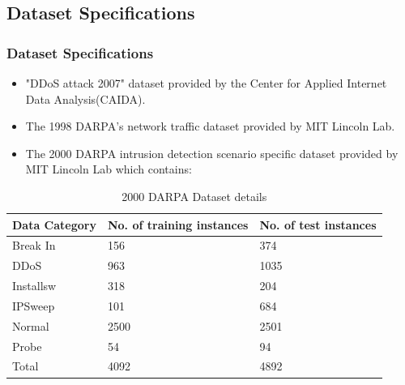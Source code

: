 \documentclass[10pt]{beamer}
\begin{document}
\begin{frame}
\section[]{Dataset Specifications}
\frametitle{Dataset Specifications}
\begin{itemize}
\footnotesize
\item
"DDoS attack 2007" dataset provided by the Center for Applied Internet Data Analysis(CAIDA).
\item
The 1998 DARPA's network traffic dataset provided by MIT Lincoln Lab.
\item
The 2000 DARPA intrusion detection scenario specific dataset provided by MIT Lincoln Lab which contains:
\end{itemize}

\begin{table}
\scriptsize
\begin{center}
\begin{tabular}{ | m{2cm} | m{2cm}| m{2cm} |} 
\hline
\textbf{Data Category} & \textbf{No. of training instances} & \textbf{No. of test instances} \\
\hline
Break In &
156 &
374 \\
\hline
DDoS &
963 &
1035 \\
\hline
Installsw &
318 &
204 \\
\hline
IPSweep &
101 &
684 \\
\hline
Normal &
2500 &
2501 \\
\hline
Probe &
54 &
94 \\
\hline
Total &
4092 &
4892 \\
\hline
\end{tabular}
\end{center}
\caption{\footnotesize 2000 DARPA Dataset details}
\end{table}
\end{frame}
\end{document}
